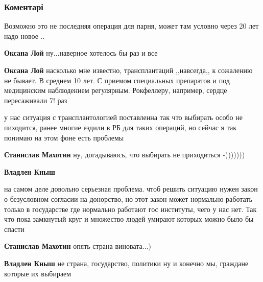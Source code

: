  
 
 
 
 
\subsubsection{Коментарі}

\begin{itemize} %
Возможно это не последняя операция для парня, может там условно через 20 лет надо новое ..

\begin{itemize} %
\textbf{Оксана Лой} ну...наверное хотелось бы раз и все

\textbf{Оксана Лой} насколько мне известно, трансплантаций ,,навсегда,, к сожалению не бывает. В среднем 10 лет. С приемом специальных препаратов и под медицинским наблюдением регулярным. Рокфеллеру, например, сердце пересаживали 7! раз
\end{itemize} %


у нас ситуация с трансплантологией поставленна так что выбирать особо не
пиходится, ранее многие ездили в РБ для таких операций, но сейчас я так понимаю
на этом фоне есть проблемы

\begin{itemize} %
\textbf{Станислав Махотин} ну, догадываюсь, что выбирать не приходиться -)))))))

\textbf{Владлен Кныш} 

на самом деле довольно серьезная проблема. чтоб решить ситуацию нужен закон о
безусловном согласии на донорство, но этот закон может нормально работать
только в государстве где нормально работают гос институты, чего у нас нет. Так
что пока замкнутый круг и множество людей умирают которых можно было бы спасти


\textbf{Станислав Махотин} опять страна виновата...)

\textbf{Владлен Кныш} не страна, государство, политики ну и конечно мы, граждане которые их выбираем
\end{itemize} %

\end{itemize} %
